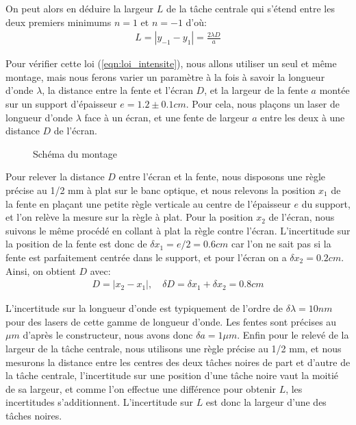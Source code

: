 \documentclass[12pt]{article}
\begin{document}
On peut alors en déduire la largeur $L$ de la tâche centrale qui s'étend entre les deux premiers minimums $n=1$ et $n=-1$ d'où:
\begin{align}
    \label{eqn:loi_L}
    L = \left\lvert y_{-1} - y_1 \right\rvert = \frac{2\lambda D}{a}
\end{align}

Pour vérifier cette loi (\ref{eqn:loi_intensite}), nous allons utiliser un seul et même montage, mais nous ferons varier un paramètre à la fois à savoir la longueur d'onde $\lambda$, la distance entre la fente et l'écran $D$, 
et la largeur de la fente $a$ montée sur un support d'épaisseur $e = 1.2 \pm 0.1cm$. Pour cela, nous plaçons un laser de longueur d'onde $\lambda$ face à un écran, et une fente de largeur $a$ entre les deux à une distance $D$ de l'écran.

\begin{figure}[!h]
    \begin{center}
        \resizebox{0.7\textwidth}{5cm}{
        
        }
    \end{center}
    \caption{Schéma du montage}
\end{figure}

Pour relever la distance $D$ entre l'écran et la fente, nous disposons une règle précise au 1/2 mm à plat sur le banc optique, et nous relevons la position $x_1$ de la fente en plaçant une petite règle verticale au centre de l'épaisseur $e$ du support, et l'on 
relève la mesure sur la règle à plat. Pour la position $x_2$ de l'écran, nous suivons le même procédé en collant à plat la règle contre l'écran. 
L'incertitude sur la position de la fente est donc de $\delta x_1 = e/2 = 0.6cm$ car l'on ne sait pas si la fente est parfaitement centrée dans le support, et pour l'écran on a $\delta x_2 = 0.2cm$. Ainsi, on obtient $D$ avec:
\begin{align}
    D = \left\lvert x_2 - x_1\right\rvert, \quad \delta D = \delta x_1 + \delta x_2 = 0.8cm
\end{align}

L'incertitude sur la longueur d'onde est typiquement de l'ordre de $\delta \lambda = 10nm$ pour des lasers de cette gamme de longueur d'onde. Les fentes sont précises au $\mu m$ d'après le constructeur,
nous avons donc $\delta a = 1 \mu m$. Enfin pour le relevé de la largeur de la tâche centrale, nous utilisons une règle précise au 1/2 mm, et nous mesurons la distance entre les centres des deux tâches noires
de part et d'autre de la tâche centrale, l'incertitude sur une position d'une tâche noire vaut la moitié de sa largeur, et comme l'on effectue une différence pour obtenir $L$, les incertitudes s'additionnent. L'incertitude sur $L$ est donc 
la largeur d'une des tâches noires.
\end{document}

